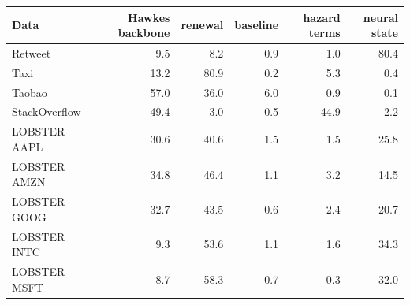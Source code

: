 \begin{tabular}{lrrrrr}
\toprule
Data & Hawkes backbone & renewal & baseline & hazard terms & neural state \\
\midrule
Retweet & 9.5 & 8.2 & 0.9 & 1.0 & 80.4 \\
Taxi & 13.2 & 80.9 & 0.2 & 5.3 & 0.4 \\
Taobao & 57.0 & 36.0 & 6.0 & 0.9 & 0.1 \\
StackOverflow & 49.4 & 3.0 & 0.5 & 44.9 & 2.2 \\
LOBSTER AAPL & 30.6 & 40.6 & 1.5 & 1.5 & 25.8 \\
LOBSTER AMZN & 34.8 & 46.4 & 1.1 & 3.2 & 14.5 \\
LOBSTER GOOG & 32.7 & 43.5 & 0.6 & 2.4 & 20.7 \\
LOBSTER INTC & 9.3 & 53.6 & 1.1 & 1.6 & 34.3 \\
LOBSTER MSFT & 8.7 & 58.3 & 0.7 & 0.3 & 32.0 \\
\bottomrule
\end{tabular}